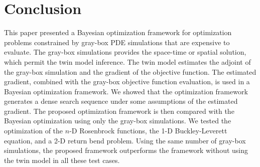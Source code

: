 \documentclass[a4paper,onecolumn]{article}
\theoremstyle{remark}
\begin{document}
\section{Conclusion}
This paper presented a Bayesian optimization framework for optimization problems constrained
by gray-box PDE simulations that are expensive to evaluate.
The gray-box simulations provides the space-time or spatial solution, which permit the twin model
inference.
The twin model estimates the adjoint of the gray-box simulation and the gradient of the
objective function.
The estimated gradient, combined with the gray-box objective function evaluation,
is used in a Bayesian optimization framework.
We showed that the optimization framework generates a dense search sequence under some
assumptions of the estimated gradient.
The proposed optimization framework is then compared with the Bayesian optimization
using only the gray-box simulations.
We tested the optimization of the $n$-D Rosenbrock functions, the 1-D
Buckley-Leverett equation, and a 2-D return bend problem.
Using the same number of gray-box simulations, the proposed framework 
outperforms the framework without using the twin model in all these test cases.

%
%
%
%
%
%
\end{document}
